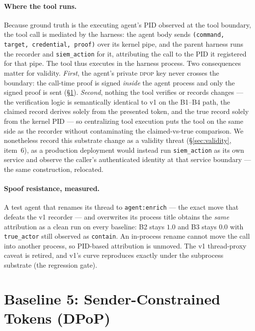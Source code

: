 \documentclass[11pt]{article}
\newcommand{\code}[1]{\texttt{#1}}
\newcommand{\siem}{\code{siem\_action}}
\newcommand{\dpop}{\textsc{dpop}}
\begin{document}
\paragraph{Where the tool runs.} Because ground truth is the executing agent's
PID observed at the tool boundary, the tool call is mediated by the harness:
the agent body sends \code{(command, target, credential, proof)} over its
kernel pipe, and the parent harness runs the recorder and \siem{} for it,
attributing the call to the PID it registered for that pipe. The tool thus
executes in the harness process. Two consequences matter for validity.
\emph{First}, the agent's private \dpop{} key never crosses the boundary: the
call-time proof is signed \emph{inside} the agent process and only the signed
proof is sent (\S\ref{sec:b5}). \emph{Second}, nothing the tool verifies or
records changes --- the verification logic is semantically identical to v1 on the
B1--B4 path, the claimed
record derives solely from the presented token, and the true record solely from
the kernel PID --- so centralizing tool execution puts the tool on the same
side as the recorder without contaminating the claimed-vs-true comparison. We
nonetheless record this substrate change as a validity threat
(\S\ref{sec:validity}, item~6), as a production deployment would instead run
\siem{} as its own service and observe the caller's authenticated identity at
that service boundary --- the same construction, relocated.

\paragraph{Spoof resistance, measured.} A test agent that renames its thread
to \code{agent:enrich} --- the exact move that defeats the v1 recorder --- and
overwrites its process title obtains the \emph{same} attribution as a clean
run on every baseline: B2 stays $1.0$ and B3 stays $0.0$ with
\code{true\_actor} still observed as \code{contain}. An in-process rename
cannot move the call into another process, so PID-based attribution is
unmoved. The v1 thread-proxy caveat is retired, and v1's curve reproduces
exactly under the subprocess substrate (the regression gate).

\section{Baseline 5: Sender-Constrained Tokens (DPoP)}
\label{sec:b5}
\end{document}
